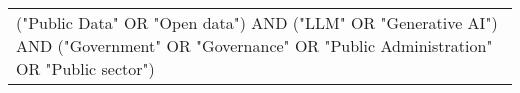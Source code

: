 \begin{table}[]
\begin{tabular}{|p{6cm}|}
("Public Data" OR "Open data") AND ("LLM" OR "Generative AI") AND ("Government" OR "Governance" OR "Public Administration" OR "Public sector") \\
\end{tabular}
\end{table}
